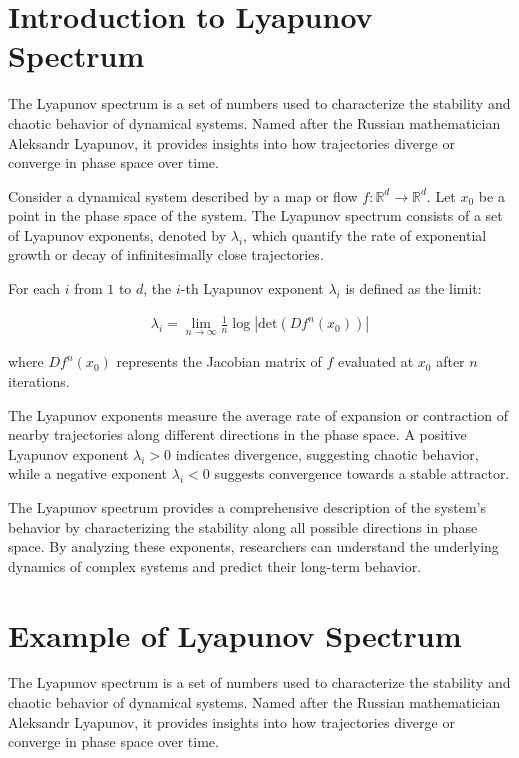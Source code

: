 \documentclass{article}
\begin{document}
\section*{Introduction to Lyapunov Spectrum}

The Lyapunov spectrum is a set of numbers used to characterize the stability and chaotic behavior of dynamical systems. Named after the Russian mathematician Aleksandr Lyapunov, it provides insights into how trajectories diverge or converge in phase space over time.

Consider a dynamical system described by a map or flow $f: \mathbb{R}^d \rightarrow \mathbb{R}^d$. Let $x_0$ be a point in the phase space of the system. The Lyapunov spectrum consists of a set of Lyapunov exponents, denoted by $\lambda_i$, which quantify the rate of exponential growth or decay of infinitesimally close trajectories.

For each $i$ from $1$ to $d$, the $i$-th Lyapunov exponent $\lambda_i$ is defined as the limit:

\begin{align}
    \lambda_i = \lim_{n \to \infty} \frac{1}{n} \log |\text{det}(Df^n(x_0))|
\end{align}

where $Df^n(x_0)$ represents the Jacobian matrix of $f$ evaluated at $x_0$ after $n$ iterations.

The Lyapunov exponents measure the average rate of expansion or contraction of nearby trajectories along different directions in the phase space. A positive Lyapunov exponent $\lambda_i > 0$ indicates divergence, suggesting chaotic behavior, while a negative exponent $\lambda_i < 0$ suggests convergence towards a stable attractor.

The Lyapunov spectrum provides a comprehensive description of the system's behavior by characterizing the stability along all possible directions in phase space. By analyzing these exponents, researchers can understand the underlying dynamics of complex systems and predict their long-term behavior.

\section*{Example of Lyapunov Spectrum}

The Lyapunov spectrum is a set of numbers used to characterize the stability and chaotic behavior of dynamical systems. Named after the Russian mathematician Aleksandr Lyapunov, it provides insights into how trajectories diverge or converge in phase space over time.
\end{document}
